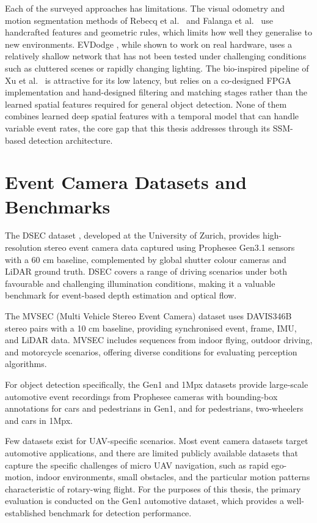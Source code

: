 \documentclass[11pt, a4paper]{report}
\begin{document}
Each of the surveyed approaches has limitations. The visual odometry and motion segmentation methods of Rebecq et al.\ \cite{rebecq2017real} and Falanga et al.\ \cite{falanga2020dynamic} use handcrafted features and geometric rules, which limits how well they generalise to new environments. EVDodge \cite{sanket2020evdodgenet}, while shown to work on real hardware, uses a relatively shallow network that has not been tested under challenging conditions such as cluttered scenes or rapidly changing lighting. The bio-inspired pipeline of Xu et al.\ \cite{li2024taming} is attractive for its low latency, but relies on a co-designed FPGA implementation and hand-designed filtering and matching stages rather than the learned spatial features required for general object detection. None of them combines learned deep spatial features with a temporal model that can handle variable event rates, the core gap that this thesis addresses through its SSM-based detection architecture.

\section{Event Camera Datasets and Benchmarks}
The DSEC dataset \cite{gehrig2021dsec}, developed at the University of Zurich, provides high-resolution stereo event camera data captured using Prophesee Gen3.1 sensors with a 60 cm baseline, complemented by global shutter colour cameras and LiDAR ground truth. DSEC covers a range of driving scenarios under both favourable and challenging illumination conditions, making it a valuable benchmark for event-based depth estimation and optical flow.

The MVSEC (Multi Vehicle Stereo Event Camera) dataset \cite{zhu2018multivehicle} uses DAVIS346B stereo pairs with a 10 cm baseline, providing synchronised event, frame, IMU, and LiDAR data. MVSEC includes sequences from indoor flying, outdoor driving, and motorcycle scenarios, offering diverse conditions for evaluating perception algorithms.

For object detection specifically, the Gen1 \cite{detournemire2020large} and 1Mpx \cite{perot2020learning} datasets provide large-scale automotive event recordings from Prophesee cameras with bounding-box annotations for cars and pedestrians in Gen1, and for pedestrians, two-wheelers and cars in 1Mpx.

Few datasets exist for UAV-specific scenarios. Most event camera datasets target automotive applications, and there are limited publicly available datasets that capture the specific challenges of micro UAV navigation, such as rapid ego-motion, indoor environments, small obstacles, and the particular motion patterns characteristic of rotary-wing flight. For the purposes of this thesis, the primary evaluation is conducted on the Gen1 automotive dataset, which provides a well-established benchmark for detection performance.
\end{document}
